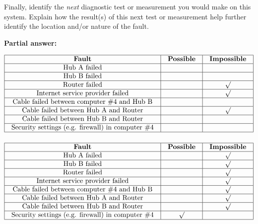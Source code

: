 Finally, identify the {\it next} diagnostic test or measurement you would make on this system.  Explain how the result(s) of this next test or measurement help further identify the location and/or nature of the fault.







\noindent
{\bf Partial answer:}


$$\vbox{\offinterlineskip
\halign{\strut
\vrule \quad\hfil # \ \hfil & 
\vrule \quad\hfil # \ \hfil & 
\vrule \quad\hfil # \ \hfil \vrule \cr
\noalign{\hrule}
%
{\bf Fault} & {\bf Possible} & {\bf Impossible} \cr
%
\noalign{\hrule}
%
Hub A failed &  &  \cr
%
\noalign{\hrule}
%
Hub B failed &  &  \cr
%
\noalign{\hrule}
%
Router failed &  & $\surd$ \cr
%
\noalign{\hrule}
%
Internet service provider failed &  & $\surd$ \cr
%
\noalign{\hrule}
%
Cable failed between computer \#4 and Hub B &  & \cr
%
\noalign{\hrule}
%
Cable failed between Hub A and Router &  & $\surd$ \cr
%
\noalign{\hrule}
%
Cable failed between Hub B and Router &  &  \cr
%
\noalign{\hrule}
%
Security settings (e.g. firewall) in computer \#4 &  &  \cr
%
\noalign{\hrule}
} %
}$$ %








$$\vbox{\offinterlineskip
\halign{\strut
\vrule \quad\hfil # \ \hfil & 
\vrule \quad\hfil # \ \hfil & 
\vrule \quad\hfil # \ \hfil \vrule \cr
\noalign{\hrule}
%
{\bf Fault} & {\bf Possible} & {\bf Impossible} \cr
%
\noalign{\hrule}
%
Hub A failed &  & $\surd$ \cr
%
\noalign{\hrule}
%
Hub B failed &  & $\surd$ \cr
%
\noalign{\hrule}
%
Router failed &  & $\surd$ \cr
%
\noalign{\hrule}
%
Internet service provider failed &  & $\surd$ \cr
%
\noalign{\hrule}
%
Cable failed between computer \#4 and Hub B &  & $\surd$ \cr
%
\noalign{\hrule}
%
Cable failed between Hub A and Router &  & $\surd$ \cr
%
\noalign{\hrule}
%
Cable failed between Hub B and Router &  & $\surd$ \cr
%
\noalign{\hrule}
%
Security settings (e.g. firewall) in computer \#4 & $\surd$ &  \cr
%
\noalign{\hrule}
} %
}$$ %



